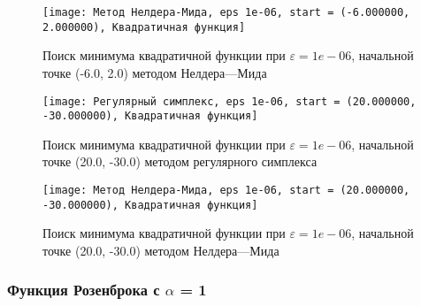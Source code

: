             \begin{figure}[H]
	        \centering
	        \texttt{[image: Метод Нелдера-Мида, eps 1e-06, start = (-6.000000, 2.000000), Квадратичная функция]}%
	        \caption{Поиск минимума квадратичной функции при $\varepsilon = 1e-06$, начальной точке (-6.0, 2.0) методом Нелдера---Мида}
	        \vspace*{-1.2cm}
            \end{figure}
            
            \begin{figure}[H]
	        \centering
	        \texttt{[image: Регулярный симплекс, eps 1e-06, start = (20.000000, -30.000000), Квадратичная функция]}%
	        \caption{Поиск минимума квадратичной функции при $\varepsilon = 1e-06$, начальной точке (20.0, -30.0) методом регулярного симплекса}
	        \vspace*{-1.2cm}
            \end{figure}
            
            \begin{figure}[H]
	        \centering
	        \texttt{[image: Метод Нелдера-Мида, eps 1e-06, start = (20.000000, -30.000000), Квадратичная функция]}%
	        \caption{Поиск минимума квадратичной функции при $\varepsilon = 1e-06$, начальной точке (20.0, -30.0) методом Нелдера---Мида}
	        \vspace*{-1.2cm}
            \end{figure}
            \subsubsection{Функция Розенброка с $\alpha$ = 1}

